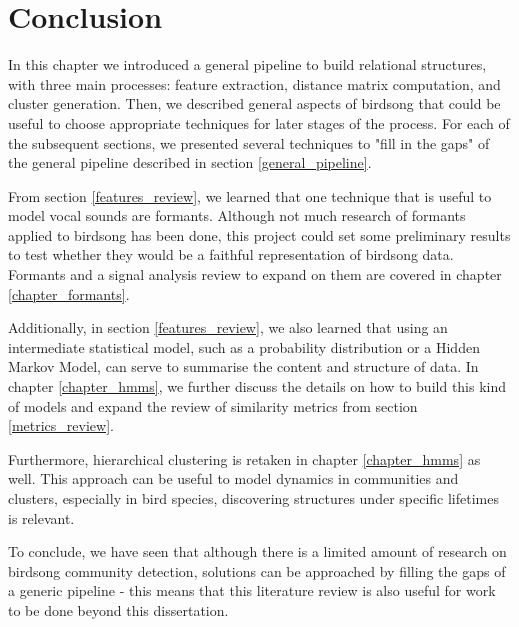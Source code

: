 \documentclass[../main.tex]{subfiles} \label{chapter_soa}
\begin{document}
\section{Conclusion}
In this chapter we introduced a general pipeline to build relational structures, with three main processes: feature extraction, distance matrix computation, and cluster generation. Then, we described general aspects of birdsong that could be useful to choose appropriate techniques for later stages of the process. For each of the subsequent sections, we presented several techniques to "fill in the gaps" of the general pipeline described in section \ref{general_pipeline}.
\par From section \ref{features_review}, we learned that one technique that is useful to model vocal sounds are formants. Although not much research of formants applied to birdsong has been done, this project could set some preliminary results to test whether they would be a faithful representation of birdsong data. Formants and a signal analysis review to expand on them are covered in chapter \ref{chapter_formants}.
\par Additionally, in section \ref{features_review}, we also learned that using an intermediate statistical model, such as a probability distribution or a Hidden Markov Model, can serve to summarise the content and structure of data. In chapter \ref{chapter_hmms}, we further discuss the details on how to build this kind of models and expand the review of similarity metrics from section \ref{metrics_review}.
\par Furthermore, hierarchical clustering is retaken in chapter \ref{chapter_hmms} as well. This approach can be useful to model dynamics in communities and clusters, especially in bird species, discovering structures under specific lifetimes is relevant. 
\par To conclude, we have seen that although there is a limited amount of research on birdsong community detection, solutions can be approached by filling the gaps of a generic pipeline - this means that this literature review is also useful for work to be done beyond this dissertation.
\end{document}
